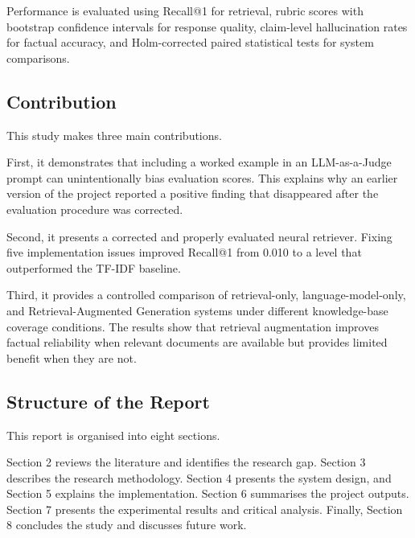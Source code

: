 Performance is evaluated using Recall@1 for retrieval, rubric scores with bootstrap confidence intervals for response quality, claim-level hallucination rates for factual accuracy, and Holm-corrected paired statistical tests for system comparisons.

\subsection{Contribution}

This study makes three main contributions.

First, it demonstrates that including a worked example in an LLM-as-a-Judge prompt can unintentionally bias evaluation scores. This explains why an earlier version of the project reported a positive finding that disappeared after the evaluation procedure was corrected.

Second, it presents a corrected and properly evaluated neural retriever. Fixing five implementation issues improved Recall@1 from 0.010 to a level that outperformed the TF-IDF baseline.

Third, it provides a controlled comparison of retrieval-only, language-model-only, and Retrieval-Augmented Generation systems under different knowledge-base coverage conditions. The results show that retrieval augmentation improves factual reliability when relevant documents are available but provides limited benefit when they are not.

\subsection{Structure of the Report}

This report is organised into eight sections.

Section 2 reviews the literature and identifies the research gap. Section 3 describes the research methodology. Section 4 presents the system design, and Section 5 explains the implementation. Section 6 summarises the project outputs. Section 7 presents the experimental results and critical analysis. Finally, Section 8 concludes the study and discusses future work.
